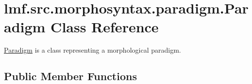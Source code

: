 \hypertarget{classlmf_1_1src_1_1morphosyntax_1_1paradigm_1_1_paradigm}{\section{lmf.\+src.\+morphosyntax.\+paradigm.\+Paradigm Class Reference}
\label{classlmf_1_1src_1_1morphosyntax_1_1paradigm_1_1_paradigm}
}


\hyperlink{classlmf_1_1src_1_1morphosyntax_1_1paradigm_1_1_paradigm}{Paradigm} is a class representing a morphological paradigm.  


\subsection*{Public Member Functions}
